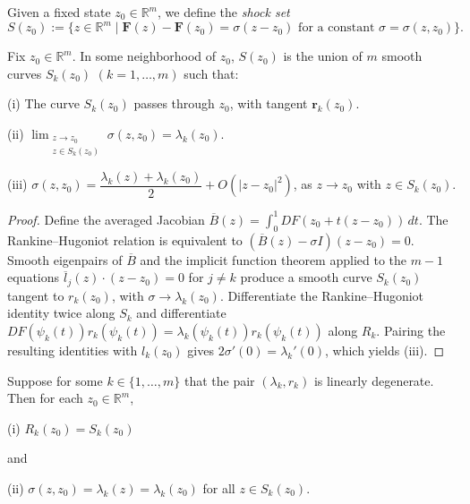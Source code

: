 \begin{definition}
\label{def:shock-set}
Given a fixed state $z_0\in\mathbb{R}^m$, we define the \textit{shock set}
$$S(z_0) := \{z\in\mathbb{R}^m \mid \mathbf{F}(z) - \mathbf{F}(z_0) = \sigma(z-z_0) \text{ for a constant } \sigma = \sigma(z,z_0)\}.$$
\end{definition}

\begin{theorem}
\label{thm:structure-of-shock-set}
Fix $z_0\in\mathbb{R}^m$. In some neighborhood of $z_0$, $S(z_0)$ is the union of $m$ smooth curves $S_k(z_0)$ $(k=1,\ldots,m)$ such that:

(i) The curve $S_k(z_0)$ passes through $z_0$, with tangent $\mathbf{r}_k(z_0)$.

(ii) $\displaystyle\lim_{\substack{z\to z_0 \\ z\in S_k(z_0)}} \sigma(z,z_0) = \lambda_k(z_0)$.

(iii) $\sigma(z,z_0) = \dfrac{\lambda_k(z)+\lambda_k(z_0)}{2} + O(|z-z_0|^2)$, as $z\to z_0$ with $z\in S_k(z_0)$.
\end{theorem}

\begin{proof}
\sketch Define the averaged Jacobian
$\overline B(z)=\int_0^1DF(z_0+t(z-z_0))\,dt$. The Rankine--Hugoniot relation is equivalent to $(\overline B(z)-\sigma I)(z-z_0)=0$. Smooth eigenpairs of $\overline B$ and the implicit function theorem applied to the $m-1$ equations
$\overline l_j(z)\cdot(z-z_0)=0$ for $j\ne k$ produce a smooth curve $S_k(z_0)$ tangent to $r_k(z_0)$, with $\sigma\to\lambda_k(z_0)$. Differentiate the Rankine--Hugoniot identity twice along $S_k$ and differentiate
$DF(\psi_k(t))r_k(\psi_k(t))=\lambda_k(\psi_k(t))r_k(\psi_k(t))$ along $R_k$. Pairing the resulting identities with $l_k(z_0)$ gives $2\sigma'(0)=\lambda_k'(0)$, which yields (iii).
\end{proof}

\begin{theorem}
\label{thm:linear-degeneracy-shock-rarefaction-coincide}
Suppose for some $k\in\{1,\ldots,m\}$ that the pair $(\lambda_k, r_k)$ is linearly degenerate. Then for each $z_0\in\mathbb{R}^m$,

(i) $R_k(z_0) = S_k(z_0)$

and

(ii) $\sigma(z,z_0) = \lambda_k(z) = \lambda_k(z_0)$ for all $z\in S_k(z_0)$.
\end{theorem}

